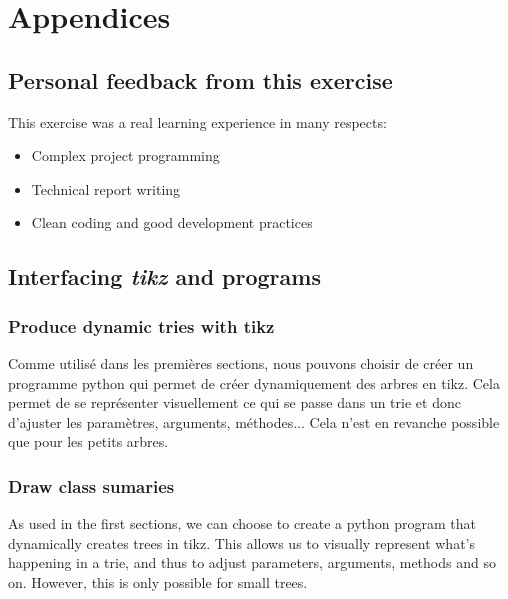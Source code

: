 \documentclass[10pt,a4paper,hidelinks]{article}
\begin{document}
\section{Appendices}
\subsection{Personal feedback from this exercise}
This exercise was a real learning experience in many respects:
\begin{itemize}
    \item Complex project programming
    \item Technical report writing
    \item Clean coding and good development practices
\end{itemize}

\subsection{Interfacing \textit{tikz} and programs}
\subsubsection{Produce dynamic tries with tikz}
Comme utilisé dans les premières sections, nous pouvons choisir de créer un programme python qui permet de créer dynamiquement des arbres en tikz. Cela permet de se représenter visuellement ce qui se passe dans un trie et donc d'ajuster les paramètres, arguments, méthodes... Cela n'est en revanche possible que pour les petits arbres.

\subsubsection{Draw class sumaries}
As used in the first sections, we can choose to create a python program that dynamically creates trees in tikz. This allows us to visually represent what's happening in a trie, and thus to adjust parameters, arguments, methods and so on. However, this is only possible for small trees.




\newpage
\listoffigures
\lstlistoflistings
\listoftables
\end{document}
